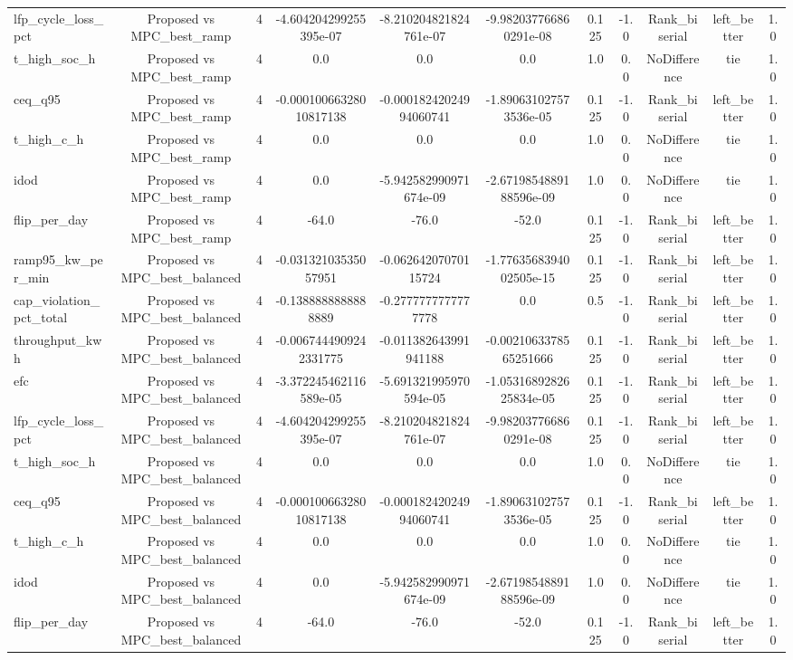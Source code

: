 \begin{table}[t]
\begin{tabular}{lcccccccccc}
lfp\_cycle\_loss\_pct & Proposed vs MPC\_best\_ramp & 4 & -4.604204299255395e-07 & -8.210204821824761e-07 & -9.982037766860291e-08 & 0.125 & -1.0 & Rank\_biserial & left\_better & 1.0 \\
t\_high\_soc\_h & Proposed vs MPC\_best\_ramp & 4 & 0.0 & 0.0 & 0.0 & 1.0 & 0.0 & NoDifference & tie & 1.0 \\
ceq\_q95 & Proposed vs MPC\_best\_ramp & 4 & -0.00010066328010817138 & -0.00018242024994060741 & -1.890631027573536e-05 & 0.125 & -1.0 & Rank\_biserial & left\_better & 1.0 \\
t\_high\_c\_h & Proposed vs MPC\_best\_ramp & 4 & 0.0 & 0.0 & 0.0 & 1.0 & 0.0 & NoDifference & tie & 1.0 \\
idod & Proposed vs MPC\_best\_ramp & 4 & 0.0 & -5.942582990971674e-09 & -2.6719854889188596e-09 & 1.0 & 0.0 & NoDifference & tie & 1.0 \\
flip\_per\_day & Proposed vs MPC\_best\_ramp & 4 & -64.0 & -76.0 & -52.0 & 0.125 & -1.0 & Rank\_biserial & left\_better & 1.0 \\
ramp95\_kw\_per\_min & Proposed vs MPC\_best\_balanced & 4 & -0.03132103535057951 & -0.06264207070115724 & -1.7763568394002505e-15 & 0.125 & -1.0 & Rank\_biserial & left\_better & 1.0 \\
cap\_violation\_pct\_total & Proposed vs MPC\_best\_balanced & 4 & -0.1388888888888889 & -0.2777777777777778 & 0.0 & 0.5 & -1.0 & Rank\_biserial & left\_better & 1.0 \\
throughput\_kwh & Proposed vs MPC\_best\_balanced & 4 & -0.0067444909242331775 & -0.011382643991941188 & -0.0021063378565251666 & 0.125 & -1.0 & Rank\_biserial & left\_better & 1.0 \\
efc & Proposed vs MPC\_best\_balanced & 4 & -3.372245462116589e-05 & -5.691321995970594e-05 & -1.0531689282625834e-05 & 0.125 & -1.0 & Rank\_biserial & left\_better & 1.0 \\
lfp\_cycle\_loss\_pct & Proposed vs MPC\_best\_balanced & 4 & -4.604204299255395e-07 & -8.210204821824761e-07 & -9.982037766860291e-08 & 0.125 & -1.0 & Rank\_biserial & left\_better & 1.0 \\
t\_high\_soc\_h & Proposed vs MPC\_best\_balanced & 4 & 0.0 & 0.0 & 0.0 & 1.0 & 0.0 & NoDifference & tie & 1.0 \\
ceq\_q95 & Proposed vs MPC\_best\_balanced & 4 & -0.00010066328010817138 & -0.00018242024994060741 & -1.890631027573536e-05 & 0.125 & -1.0 & Rank\_biserial & left\_better & 1.0 \\
t\_high\_c\_h & Proposed vs MPC\_best\_balanced & 4 & 0.0 & 0.0 & 0.0 & 1.0 & 0.0 & NoDifference & tie & 1.0 \\
idod & Proposed vs MPC\_best\_balanced & 4 & 0.0 & -5.942582990971674e-09 & -2.6719854889188596e-09 & 1.0 & 0.0 & NoDifference & tie & 1.0 \\
flip\_per\_day & Proposed vs MPC\_best\_balanced & 4 & -64.0 & -76.0 & -52.0 & 0.125 & -1.0 & Rank\_biserial & left\_better & 1.0 \\
\bottomrule
\end{tabular}
\end{table}